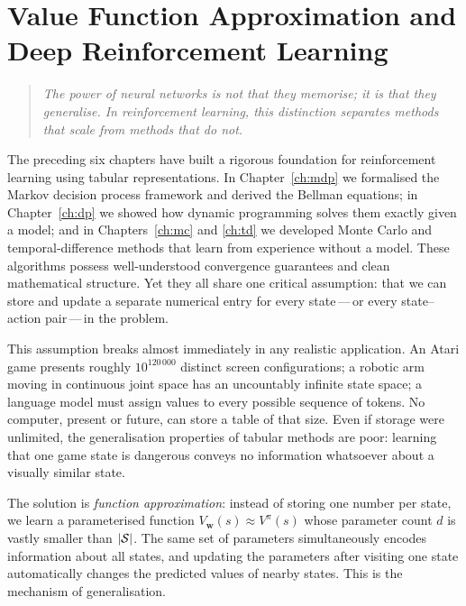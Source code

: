 \chapter[Value Function Approximation]{Value Function Approximation and Deep Reinforcement Learning}
\label{ch:value-approx}

\begin{quote}
\itshape
The power of neural networks is not that they memorise; it is that they generalise.
In reinforcement learning, this distinction separates methods that scale from methods that do not.
\end{quote}

\bigskip

The preceding six chapters have built a rigorous foundation for reinforcement learning using tabular
representations.  In Chapter~\ref{ch:mdp} we formalised the Markov decision process framework and
derived the Bellman equations; in Chapter~\ref{ch:dp} we showed how dynamic programming solves them
exactly given a model; and in Chapters~\ref{ch:mc} and \ref{ch:td} we developed Monte Carlo and
temporal-difference methods that learn from experience without a model.  These algorithms possess
well-understood convergence guarantees and clean mathematical structure.  Yet they all share one
critical assumption: that we can store and update a separate numerical entry for every
state\,---\,or every state--action pair\,---\,in the problem.

This assumption breaks almost immediately in any realistic application.  An Atari game presents
roughly $10^{120\,000}$ distinct screen configurations; a robotic arm moving in continuous joint
space has an uncountably infinite state space; a language model must assign values to every possible
sequence of tokens.  No computer, present or future, can store a table of that size.  Even if
storage were unlimited, the generalisation properties of tabular methods are poor: learning that
one game state is dangerous conveys no information whatsoever about a visually similar state.

The solution is \emph{function approximation}: instead of storing one
number per state, we learn a parameterised function $V_\mathbf{w}(s) \approx V^\pi(s)$ whose
parameter count $d$ is vastly smaller than $|\mathcal{S}|$.  The same set of parameters simultaneously
encodes information about all states, and updating the parameters after visiting one state
automatically changes the predicted values of nearby states.  This is the mechanism of
generalisation.

